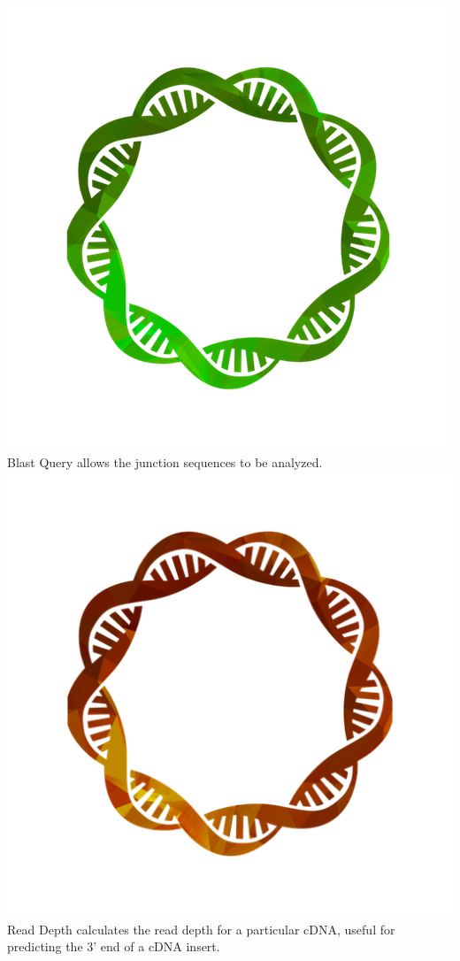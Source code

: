 \documentclass[11pt,fleqn]{book} %
\newcommand{\BlastQuery}{{\color{ForestGreen} Blast Query }}
\newcommand{\ReadDepth}{{\color{Bittersweet} Read Depth }}
\begin{document}
\includegraphics[scale=0.3]{Pictures/query_blast.png} \BlastQuery allows the junction sequences to be analyzed.\\

\includegraphics[scale=0.3]{Pictures/read_depth.png} \ReadDepth calculates the read depth for a particular cDNA, useful for \\predicting the 3’ end of a cDNA insert.
\end{document}

